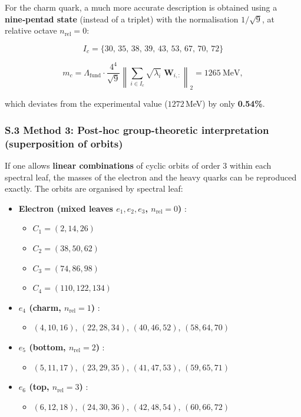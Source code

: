 \documentclass[11pt]{article}
\providecommand{\tightlist}{\setlength{\itemsep}{2pt}\setlength{\parskip}{6pt}}
\providecommand{\tightlist}{%
  \setlength{\itemsep}{2pt}\setlength{\parskip}{6pt}
}
\begin{document}
For the charm quark, a much more accurate description is obtained using
a \textbf{nine‑pentad state} (instead of a triplet) with the
normalisation \(1/\sqrt{9}\), at relative octave \(n_{\text{rel}}=0\):

\[
I_c = \{30,\,35,\,38,\,39,\,43,\,53,\,67,\,70,\,72\}
\]

\[
m_c = \Lambda_{\text{fund}} \cdot \frac{4^{4}}{\sqrt{9}} \left\| \sum_{i\in I_c} \sqrt{\lambda_i}\; \mathbf{W}_{i,:} \right\|_2 = 1265\ \text{MeV},
\]

which deviates from the experimental value (\(1272\)\,MeV) by only
\textbf{0.54\%}.

\hypertarget{s.3-method-3-posthoc-grouptheoretic-interpretation-superposition-of-orbits}{%
\subsubsection{S.3 Method 3: Post‑hoc group‑theoretic interpretation
(superposition of
orbits)}\label{s.3-method-3-posthoc-grouptheoretic-interpretation-superposition-of-orbits}}

If one allows \textbf{linear combinations} of cyclic orbits of order
\(3\) within each spectral leaf, the masses of the electron and the
heavy quarks can be reproduced exactly. The orbits are organised by
spectral leaf:

\begin{itemize}
\tightlist
\item
  \textbf{Electron (mixed leaves \(e_1,e_2,e_3\), \(n_{\text{rel}}=0\))}
  :

  \begin{itemize}
  \tightlist
  \item
    \(C_1 = (2,14,26)\)
  \item
    \(C_2 = (38,50,62)\)
  \item
    \(C_3 = (74,86,98)\)
  \item
    \(C_4 = (110,122,134)\)
  \end{itemize}
\item
  \textbf{\(e_4\) (charm, \(n_{\text{rel}}=1\))} :

  \begin{itemize}
  \tightlist
  \item
    \((4,10,16)\), \((22,28,34)\), \((40,46,52)\), \((58,64,70)\)
  \end{itemize}
\item
  \textbf{\(e_5\) (bottom, \(n_{\text{rel}}=2\))} :

  \begin{itemize}
  \tightlist
  \item
    \((5,11,17)\), \((23,29,35)\), \((41,47,53)\), \((59,65,71)\)
  \end{itemize}
\item
  \textbf{\(e_6\) (top, \(n_{\text{rel}}=3\))} :

  \begin{itemize}
  \tightlist
  \item
    \((6,12,18)\), \((24,30,36)\), \((42,48,54)\), \((60,66,72)\)
  \end{itemize}
\end{itemize}
\end{document}
